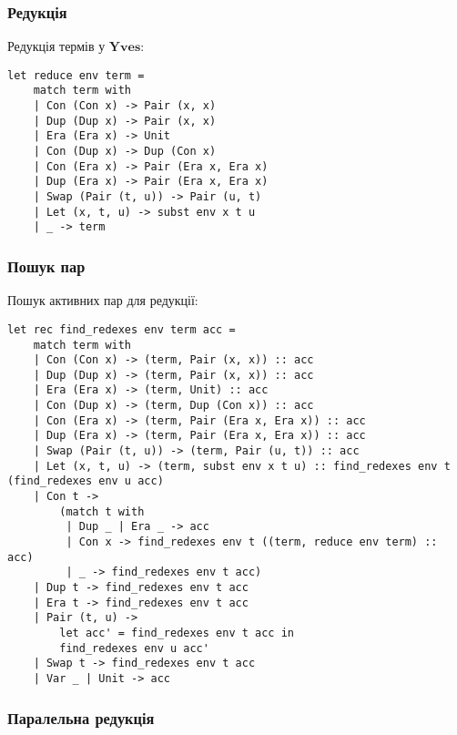 \documentclass{article}
\begin{document}
\newpage
\subsubsection{Редукція}

\begin{definition}
Редукція термів у $\mathbf{Yves}$:
\begin{lstlisting}[mathescape=true]
let reduce env term =
    match term with
    | Con (Con x) -> Pair (x, x)
    | Dup (Dup x) -> Pair (x, x)
    | Era (Era x) -> Unit
    | Con (Dup x) -> Dup (Con x)
    | Con (Era x) -> Pair (Era x, Era x)
    | Dup (Era x) -> Pair (Era x, Era x)
    | Swap (Pair (t, u)) -> Pair (u, t)
    | Let (x, t, u) -> subst env x t u
    | _ -> term
\end{lstlisting}
\end{definition}

\subsubsection{Пошук пар}

\begin{definition}
Пошук активних пар для редукції:
\begin{lstlisting}[mathescape=true]
let rec find_redexes env term acc =
    match term with
    | Con (Con x) -> (term, Pair (x, x)) :: acc
    | Dup (Dup x) -> (term, Pair (x, x)) :: acc
    | Era (Era x) -> (term, Unit) :: acc
    | Con (Dup x) -> (term, Dup (Con x)) :: acc
    | Con (Era x) -> (term, Pair (Era x, Era x)) :: acc
    | Dup (Era x) -> (term, Pair (Era x, Era x)) :: acc
    | Swap (Pair (t, u)) -> (term, Pair (u, t)) :: acc
    | Let (x, t, u) -> (term, subst env x t u) :: find_redexes env t (find_redexes env u acc)
    | Con t ->
        (match t with
         | Dup _ | Era _ -> acc
         | Con x -> find_redexes env t ((term, reduce env term) :: acc)
         | _ -> find_redexes env t acc)
    | Dup t -> find_redexes env t acc
    | Era t -> find_redexes env t acc
    | Pair (t, u) ->
        let acc' = find_redexes env t acc in
        find_redexes env u acc'
    | Swap t -> find_redexes env t acc
    | Var _ | Unit -> acc
\end{lstlisting}
\end{definition}

\newpage

\subsubsection{Паралельна редукція}
\end{document}
